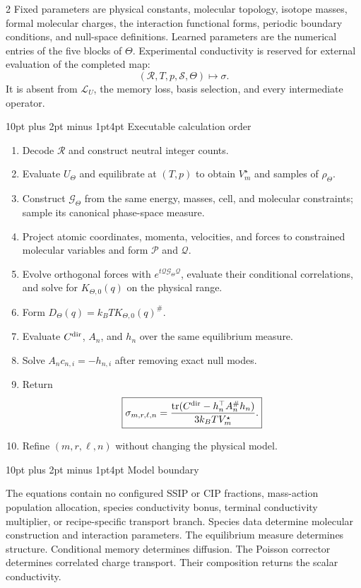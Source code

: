 \documentclass[10pt]{article}
\makeatletter
\renewcommand\section{\@startsection{section}{1}{0pt}%
  {10pt plus 2pt minus 1pt}{4pt}%
  {\large\sffamily\bfseries\color{lithioxfontgreen}}}
\newcommand{\tr}{\operatorname{tr}}
\newcommand{\pinv}{^{\#}}
\makeatother
\begin{document}
\begin{multicols}{2}
Fixed parameters are physical constants, molecular topology, isotope masses,
formal molecular charges, the interaction functional forms, periodic boundary
conditions, and null-space definitions.  Learned parameters are the numerical
entries of the five blocks of \(\Theta\).  Experimental conductivity is reserved
for external evaluation of the completed map:
\[
(\mathcal R,T,p,\mathcal S,\Theta)\longmapsto\sigma.
\]
It is absent from \(\mathcal L_U\), the memory loss, basis selection, and every
intermediate operator.

\section{Executable calculation order}

\begin{enumerate}[leftmargin=*,nosep]
\item Decode \(\mathcal R\) and construct neutral integer counts.
\item Evaluate \(U_\Theta\) and equilibrate at \((T,p)\) to obtain \(V_m^\star\)
      and samples of \(\rho_\Theta\).
\item Construct \(\mathcal G_\Theta\) from the same energy, masses, cell, and
      molecular constraints; sample its canonical phase-space measure.
\item Project atomic coordinates, momenta, velocities, and forces to constrained
      molecular variables and form \(\mathcal P\) and \(\mathcal Q\).
\item Evolve orthogonal forces with
      \(e^{t\mathcal Q\mathcal G_\Theta\mathcal Q}\), evaluate their conditional
      correlations, and solve for
      \(K_{\Theta,0}(q)\) on the physical range.
\item Form \(D_\Theta(q)=k_BT K_{\Theta,0}(q)\pinv\).
\item Evaluate \(C^{\rm dir}\), \(A_n\), and \(h_n\) over the same equilibrium measure.
\item Solve \(A_nc_{n,i}=-h_{n,i}\) after removing exact null modes.
\item Return
\[
\boxed{
\sigma_{m,r,\ell,n}=
\frac{\tr(C^{\rm dir}-h_n^\top A_n\pinv h_n)}
{3k_BTV_m^\star}.}
\]
\item Refine \((m,r,\ell,n)\) without changing the physical model.
\end{enumerate}

\section{Model boundary}

The equations contain no configured SSIP or CIP fractions, mass-action population
allocation, species conductivity bonus, terminal conductivity multiplier, or
recipe-specific transport branch. Species data determine molecular construction and
interaction parameters. The equilibrium measure determines structure. Conditional
memory determines diffusion. The Poisson corrector determines correlated charge
transport. Their composition returns the scalar conductivity.

\end{multicols}
\end{document}
